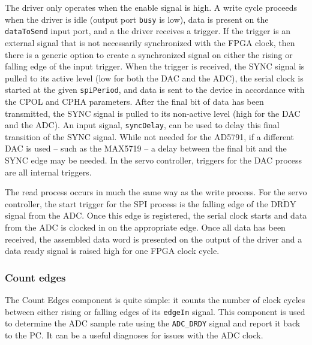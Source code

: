 \documentclass{article}
\begin{document}
The driver only operates when the enable signal is high.  A write cycle proceeds when the driver is idle (output port \verb+busy+ is low), data is present on the \verb+dataToSend+ input port, and a the driver receives a trigger.  If the trigger is an external signal that is not necessarily synchronized with the FPGA clock, then there is a generic option to create a synchronized signal on either the rising or falling edge of the input trigger.  When the trigger is received, the SYNC signal is pulled to its active level (low for both the DAC and the ADC), the serial clock is started at the given \verb+spiPeriod+, and data is sent to the device in accordance with the CPOL and CPHA parameters.  After the final bit of data has been transmitted, the SYNC signal is pulled to its non-active level (high for the DAC and the ADC).  An input signal, \verb+syncDelay+, can be used to delay this final transition of the SYNC signal.  While not needed for the AD5791, if a different DAC is used -- such as the MAX5719 -- a delay between the final bit and the SYNC edge may be needed.  In the servo controller, triggers for the DAC process are all internal triggers.

The read process occurs in much the same way as the write process.  For the servo controller, the start trigger for the SPI process is the falling edge of the $\overline{\text{DRDY}}$ signal from the ADC.  Once this edge is registered, the serial clock starts and data from the ADC is clocked in on the appropriate edge.  Once all data has been received, the assembled data word is presented on the output of the driver and a data ready signal is raised high for one FPGA clock cycle.

\subsubsection{Count edges}
\label{sssec:countEdges}
The Count Edges component is quite simple: it counts the number of clock cycles between either rising or falling edges of its \verb|edgeIn| signal.  This component is used to determine the ADC sample rate using the \verb|ADC_DRDY| signal and report it back to the PC.  It can be a useful diagnoses for issues with the ADC clock.
\end{document}
